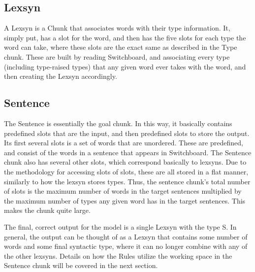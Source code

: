 \subsection{Lexsyn}
A Lexsyn is a Chunk that associates words with their type information. It, simply put, has a slot for the word, and then has the five slots for each type the word can take, where these slots are the exact same as described in the Type chunk. These are built by reading Switchboard, and associating every type (including type-raised types) that any given word ever takes with the word, and then creating the Lexsyn accordingly.  

\subsection{Sentence}
The Sentence is essentially the goal chunk. In this way, it basically contains predefined slots that are the input, and then predefined slots to store the output. Its first several slots is a set of words that are unordered. These are predefined, and consist of the words in a sentence that appears in Switchboard. The Sentence chunk also has several other slots, which correspond basically to lexsyns. Due to the methodology for accessing slots of slots, these are all stored in a flat manner, similarly to how the lexsyn stores types. Thus, the sentence chunk's total number of slots is the maximum number of words in the target sentences multiplied by the maximum number of types any given word has in the target sentences. This makes the chunk quite large. 

The final, correct output for the model is a single Lexsyn with the type S. In general, the output can be thought of as a Lexsyn that contains some number of words and some final syntactic type, where it can no longer combine with any of the other lexsyns. Details on how the Rules utilize the working space in the Sentence chunk will be covered in the next section. 
